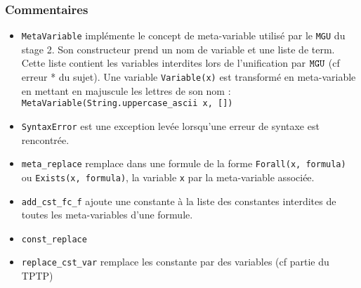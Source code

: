 \documentclass[12pt]{article}
\begin{document}
\subsubsection*{Commentaires}
\begin{itemize}
\item \verb?MetaVariable? implémente le concept de meta-variable utilisé par le \verb?MGU? du stage 2. Son constructeur prend un nom de variable et une liste de term. Cette liste contient les variables interdites lors de l'unification par $\verb?MGU?$ (cf erreur * du sujet). Une variable \verb?Variable(x)? est transformé en meta-variable en mettant en majuscule les lettres de son nom :\\ \verb?MetaVariable(String.uppercase_ascii x, [])?
\item \verb?SyntaxError? est une exception levée lorsqu'une erreur de syntaxe est rencontrée.
\item \verb?meta_replace? remplace dans une formule de la forme \verb?Forall(x, formula)? ou \verb?Exists(x, formula)?, la variable \verb?x? par la meta-variable associée.
\item \verb?add_cst_fc_f? ajoute une constante à la liste des constantes interdites de toutes les meta-variables d'une formule.
\item \verb?const_replace?
\item \verb?replace_cst_var? remplace les constante par des variables (cf partie du TPTP)
\end{itemize}
\end{document}

